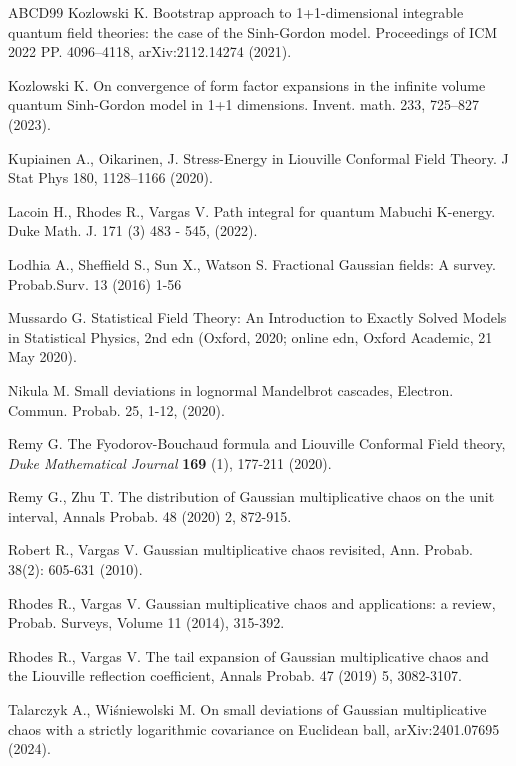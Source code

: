 \documentclass[11pt]{article}
\numberwithin{equation}{section}
\theoremstyle{definition}
\begin{document}
\begin{thebibliography}{ABCD99}
 Kozlowski K. Bootstrap approach to 1+1-dimensional integrable quantum field theories: the case of the Sinh-Gordon model. Proceedings of ICM 2022 PP. 4096–4118, arXiv:2112.14274 (2021).

 Kozlowski K. On convergence of form factor expansions in the infinite volume quantum Sinh-Gordon model in 1+1 dimensions. Invent. math. 233, 725–827 (2023).

 Kupiainen A., Oikarinen, J. Stress-Energy in Liouville Conformal Field Theory. J Stat Phys 180, 1128–1166 (2020).

 Lacoin H., Rhodes R., Vargas V. Path integral for quantum Mabuchi K-energy. Duke Math. J. 171 (3) 483 - 545, (2022).

 Lodhia A., Sheffield S., Sun X., Watson S. Fractional Gaussian fields: A survey. Probab.Surv. 13 (2016) 1-56

 Mussardo G. Statistical Field Theory: An Introduction to Exactly Solved Models in Statistical Physics, 2nd edn (Oxford, 2020; online edn, Oxford Academic, 21 May 2020).


 Nikula M. Small deviations in lognormal Mandelbrot cascades, Electron. Commun. Probab. 25, 1-12, (2020).

Remy G. The Fyodorov-Bouchaud formula and Liouville Conformal Field theory, \emph{Duke Mathematical Journal} {\textbf{169}} (1), 177-211 (2020).

 Remy G., Zhu T. The distribution of Gaussian multiplicative chaos on the unit interval, Annals Probab. 48 (2020) 2, 872-915.

 Robert R., Vargas V. Gaussian multiplicative chaos revisited, Ann. Probab. 38(2): 605-631 (2010).

Rhodes R., Vargas V. Gaussian multiplicative chaos and applications: a review, Probab. Surveys, Volume 11 (2014), 315-392.

 Rhodes R., Vargas V. The tail expansion of Gaussian multiplicative chaos and the Liouville reflection coefficient, Annals Probab. 47 (2019) 5, 3082-3107.

 Talarczyk A., Wiśniewolski M. On small deviations of Gaussian multiplicative chaos with a strictly logarithmic covariance on Euclidean ball, 	arXiv:2401.07695 (2024).



\end{thebibliography}
\end{document}
